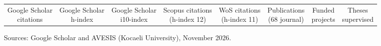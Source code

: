 
\newcommand*{\cvstat}[2]{%
  \begin{tabular}[t]{@{}c@{}}
    {\fontsize{15pt}{17pt}\bodyfont\bfseries\color{darktext}#1}\\[0.6mm]
    {\fontsize{7.6pt}{9pt}\bodyfontlight\color{graytext}\begin{tabular}[t]{@{}c@{}}#2\end{tabular}}
  \end{tabular}}

\begingroup
\setlength\tabcolsep{0pt}
\noindent\begin{tabular*}{\textwidth}{@{\extracolsep{\fill}}cccccccc@{}}
  \cvstat{1,216}{Google Scholar\\citations} &
  \cvstat{17}{Google Scholar\\h-index} &
  \cvstat{33}{Google Scholar\\i10-index} &
  \cvstat{547}{Scopus citations\\(h-index 12)} &
  \cvstat{383}{WoS citations\\(h-index 11)} &
  \cvstat{163}{Publications\\(68 journal)} &
  \cvstat{21}{Funded\\projects} &
  \cvstat{24+}{Theses\\supervised} \\
\end{tabular*}
\par\endgroup
\vspace{1.2mm}
{\fontsize{7.2pt}{1em}\bodyfontlight\color{graytext}Sources: Google Scholar and AVESIS (Kocaeli University), November 2026.}\par
